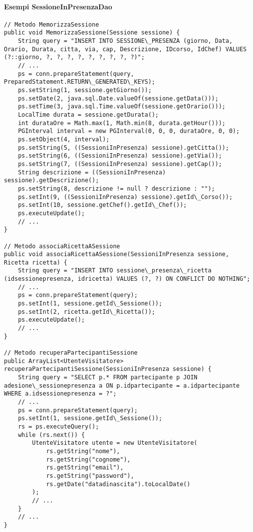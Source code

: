 \paragraph{Esempi SessioneInPresenzaDao}
\begin{verbatim}
// Metodo MemorizzaSessione
public void MemorizzaSessione(Sessione sessione) {
    String query = "INSERT INTO SESSIONE\_PRESENZA (giorno, Data, Orario, Durata, citta, via, cap, Descrizione, IDcorso, IdChef) VALUES (?::giorno, ?, ?, ?, ?, ?, ?, ?, ?, ?)";
    // ...
    ps = conn.prepareStatement(query, PreparedStatement.RETURN\_GENERATED\_KEYS);
    ps.setString(1, sessione.getGiorno());
    ps.setDate(2, java.sql.Date.valueOf(sessione.getData()));
    ps.setTime(3, java.sql.Time.valueOf(sessione.getOrario()));
    LocalTime durata = sessione.getDurata();
    int durataOre = Math.max(1, Math.min(8, durata.getHour()));
    PGInterval interval = new PGInterval(0, 0, 0, durataOre, 0, 0);
    ps.setObject(4, interval);
    ps.setString(5, ((SessioniInPresenza) sessione).getCitta());
    ps.setString(6, ((SessioniInPresenza) sessione).getVia());
    ps.setString(7, ((SessioniInPresenza) sessione).getCap());
    String descrizione = ((SessioniInPresenza) sessione).getDescrizione();
    ps.setString(8, descrizione != null ? descrizione : "");
    ps.setInt(9, ((SessioniInPresenza) sessione).getId\_Corso());
    ps.setInt(10, sessione.getChef().getId\_Chef());
    ps.executeUpdate();
    // ...
}

// Metodo associaRicettaASessione
public void associaRicettaASessione(SessioniInPresenza sessione, Ricetta ricetta) {
    String query = "INSERT INTO sessione\_presenza\_ricetta (idsessionepresenza, idricetta) VALUES (?, ?) ON CONFLICT DO NOTHING";
    // ...
    ps = conn.prepareStatement(query);
    ps.setInt(1, sessione.getId\_Sessione());
    ps.setInt(2, ricetta.getId\_Ricetta());
    ps.executeUpdate();
    // ...
}

// Metodo recuperaPartecipantiSessione
public ArrayList<UtenteVisitatore> recuperaPartecipantiSessione(SessioniInPresenza sessione) {
    String query = "SELECT p.* FROM partecipante p JOIN adesione\_sessionepresenza a ON p.idpartecipante = a.idpartecipante WHERE a.idsessionepresenza = ?";
    // ...
    ps = conn.prepareStatement(query);
    ps.setInt(1, sessione.getId\_Sessione());
    rs = ps.executeQuery();
    while (rs.next()) {
        UtenteVisitatore utente = new UtenteVisitatore(
            rs.getString("nome"),
            rs.getString("cognome"),
            rs.getString("email"),
            rs.getString("password"),
            rs.getDate("datadinascita").toLocalDate()
        );
        // ...
    }
    // ...
}
\end{verbatim}

